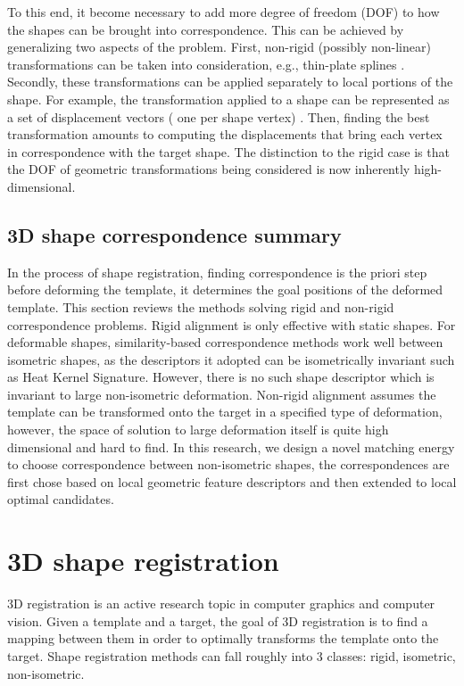 To this end, it become necessary to add more degree of freedom (DOF) to how the shapes can be brought into correspondence. This can be achieved by generalizing two aspects of the problem. First, non-rigid (possibly non-linear) transformations can be taken into consideration, e.g., thin-plate splines \citep{chui2003new}. Secondly, these transformations can be applied separately to local portions of the shape. For example, the transformation applied to a shape can be represented as a set of displacement vectors ( one per shape vertex) \citep{pauly2005example}. Then, finding the best transformation amounts to computing the displacements that bring each vertex in correspondence with the target shape. The distinction to the rigid case is that the DOF of geometric transformations being considered is now inherently high-dimensional.

\subsection{3D shape correspondence summary}
In the process of shape registration, finding correspondence is the priori step before deforming the template, it determines the goal positions of the deformed template. This section reviews the methods solving rigid and non-rigid correspondence problems. Rigid alignment is only effective with static shapes. For deformable shapes, similarity-based correspondence methods work well between isometric shapes, as the descriptors it adopted can be isometrically invariant such as Heat Kernel Signature. However, there is no such shape descriptor which is invariant to large non-isometric deformation. Non-rigid alignment assumes the template can be transformed onto the target in a specified type of deformation, however, the space of solution to large deformation itself is quite high dimensional and hard to find. In this research, we design a novel matching energy to choose correspondence between non-isometric shapes, the correspondences are first chose based on local geometric feature descriptors and then extended to local optimal candidates.

\section{3D shape registration}
3D registration is an active research topic in computer graphics and computer vision. Given a template and a target, the goal of 3D registration is to find a mapping between them in order to optimally transforms the template onto the target. Shape registration methods can fall roughly into 3 classes: rigid, isometric, non-isometric.

